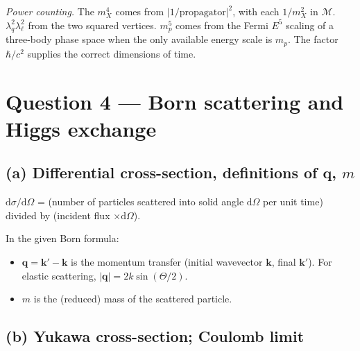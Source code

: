\documentclass[11pt]{article}
\newcommand{\de}{\mathrm{d}}
\begin{document}
\textit{Power counting.} The $m_X^4$ comes from $|1/\text{propagator}|^2$, with each $1/m_X^2$ in $\mathcal{M}$. $\lambda_q^2\lambda_\ell^2$ from the two squared vertices. $m_p^5$ comes from the Fermi $E^5$ scaling of a three-body phase space when the only available energy scale is $m_p$. The factor $\hbar/c^2$ supplies the correct dimensions of time.

\section*{Question 4 --- Born scattering and Higgs exchange}

\subsection*{(a) Differential cross-section, definitions of $\bm q$, $m$}

$\de\sigma/\de\Omega$ = (number of particles scattered into solid angle $\de\Omega$ per unit time) divided by (incident flux $\times \de\Omega$).

In the given Born formula:
\begin{itemize}
\item $\bm q = \bm k' - \bm k$ is the momentum transfer (initial wavevector $\bm k$, final $\bm k'$). For elastic scattering, $|\bm q|=2k\sin(\Theta/2)$.
\item $m$ is the (reduced) mass of the scattered particle.
\end{itemize}

\subsection*{(b) Yukawa cross-section; Coulomb limit}
\end{document}
